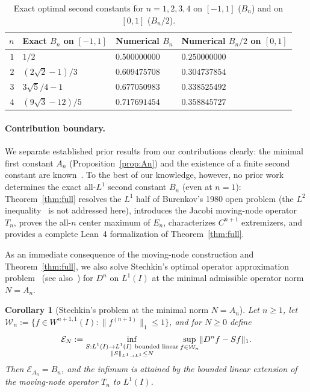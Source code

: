 \documentclass[11pt,a4paper]{article}
\newcommand{\Lone}[1]{\lVert #1\rVert_1}
\newtheorem{corollary}[theorem]{Corollary}
\theoremstyle{remark}
\numberwithin{equation}{section}
\begin{document}
\begin{table}[htbp]
\centering
\caption{Exact optimal second constants for $n = 1, 2, 3, 4$ on $[-1,1]$ ($B_n$) and on $[0,1]$ ($B_n/2$).}
\label{tab:small-n}
\small
\begin{tabular}{rlll}
\toprule
$n$ & Exact $B_n$ on $[-1,1]$ & Numerical $B_n$ & Numerical $B_n / 2$ on $[0,1]$ \\
\midrule
$1$ & $1/2$ & $0.500000000$ & $0.250000000$ \\
$2$ & $(2\sqrt{2} - 1)/3$ & $0.609475708$ & $0.304737854$ \\
$3$ & $3\sqrt{5}/4 - 1$ & $0.677050983$ & $0.338525492$ \\
$4$ & $(9\sqrt{3} - 12)/5$ & $0.717691454$ & $0.358845727$ \\
\bottomrule
\end{tabular}
\end{table}

\paragraph{Contribution boundary.}
We separate established prior results from our contributions clearly: the minimal first constant $A_n$ (Proposition~\ref{prop:An}) and the existence of a finite second constant are known~\cite{Burenkov1980,BKP1997,Kofanov2002,BKKP2003}. To the best of our knowledge, however, no prior work determines the exact all-$L^1$ second constant $B_n$ (even at $n = 1$): Theorem~\ref{thm:full} resolves the $L^1$ half of Burenkov's 1980 open problem (the $L^2$ inequality~\cite[eq.~(25)]{Burenkov1980} is not addressed here), introduces the Jacobi moving-node operator $T_n$, proves the all-$n$ center maximum of $E_n$, characterizes $C^{n+1}$ extremizers, and provides a complete Lean~4 formalization of Theorem~\ref{thm:full}.

As an immediate consequence of the moving-node construction and Theorem~\ref{thm:full}, we also solve Stechkin's optimal operator approximation problem~\cite{Stechkin1967} (see also~\cite[Proposition~2]{Skorokhodov2019}) for $D^n$ on $L^1(I)$ at the minimal admissible operator norm $N = A_n$.

\begin{corollary}[Stechkin's problem at the minimal norm $N = A_n$]
    \label{cor:stechkin}
    Let $n \ge 1$, let $\mathcal{W}_n := \{f \in W^{n+1,1}(I) : \Lone{f^{(n+1)}} \le 1\}$, and for $N \ge 0$ define
    \[
        \mathcal{E}_N :=
        \inf_{\substack{S : L^1(I) \to L^1(I)\ \text{\textup{bounded linear}} \\ \lVert S\rVert_{L^1 \to L^1} \le N}}
        \sup_{f \in \mathcal{W}_n} \Lone{D^n f - Sf}.
    \]
    Then $\mathcal{E}_{A_n} = B_n$, and the infimum is attained by the bounded linear extension of the moving-node operator $T_n$ to $L^1(I)$.
\end{corollary}
\end{document}
